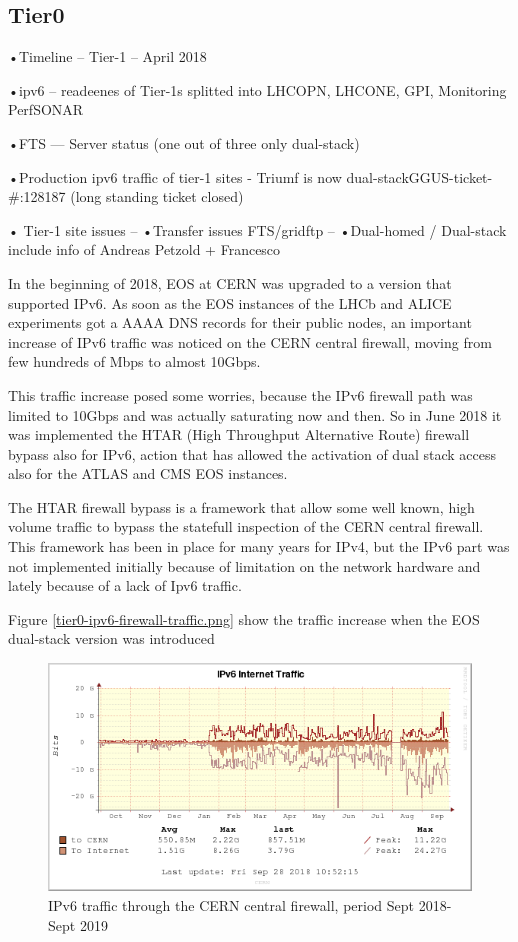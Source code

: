 \subsection{Tier0}
•Timeline  -- Tier-1 – April 2018

•ipv6      -- readeenes of Tier-1s splitted into LHCOPN, LHCONE, GPI, Monitoring PerfSONAR

•FTS       --- Server status (one out of three only dual-stack)

•Production ipv6 traffic of tier-1 sites
- Triumf is now dual-stackGGUS-ticket-\#:128187 (long standing ticket closed)

• Tier-1 site issues
--  •Transfer issues FTS/gridftp
--  •Dual-homed / Dual-stack  include info of Andreas Petzold + Francesco

In the beginning of 2018, EOS at CERN was upgraded to a version that supported IPv6. 
As soon as the EOS instances of the LHCb and ALICE experiments got a AAAA DNS records for their public nodes, an important increase of IPv6 traffic was noticed on the CERN central firewall, moving from few hundreds of Mbps to almost 10Gbps.

This traffic increase posed some worries, because the IPv6 firewall path was limited to 10Gbps and was actually saturating now and then. So in June 2018 it was implemented the HTAR (High Throughput Alternative Route) firewall bypass also for IPv6, action that has allowed the activation of dual stack access also for the ATLAS and CMS EOS instances. 

The HTAR firewall bypass is a framework that allow some well known, high volume traffic to bypass the statefull inspection of the CERN central firewall. This framework has been in place for many years for IPv4, but the IPv6 part was not implemented initially because of limitation on the network hardware and lately because of a lack of Ipv6 traffic.

Figure \ref{tier0-ipv6-firewall-traffic.png} show the traffic increase when the EOS dual-stack version was introduced

\begin{figure}[h!]
\centering
\includegraphics[width=5.6 in]{tier0-ipv6-firewall-traffic.png}
\caption{IPv6 traffic through the CERN central firewall, period Sept 2018-Sept 2019}
\label{fig:tier0-traffic}
\end{figure}
